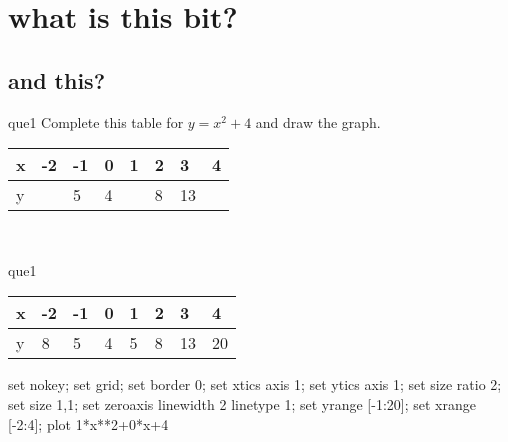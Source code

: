 \documentclass[13.5pt, varwidth=true]{beamer}
\begin{document}
\date{}

\section[Graphs]{what is this bit?}
\subsection[title]{and this?}

\begin{frame}[shrink=19,fragile]
	\begin{beamercolorbox}[rounded=true, left, shadow=true,wd=14.8cm]{que1}
		 Complete this table for $y = x^{2} + 4$ and draw the graph. \\[0.3cm] \renewcommand{\arraystretch}{1.2}\begin{tabular}{|C|C|C|C|C|C|C|C|} \hline x & -2 & -1 & 0 & 1 & 2 & 3 & 4 \\ \hline y &  & 5 & 4 &  & 8 & 13 & \\ \hline \end{tabular}\\[0.3cm]
	\end{beamercolorbox}
\end{frame}
\begin{frame}[shrink=19,fragile]
	\begin{beamercolorbox}[rounded=true, left, shadow=true,wd=14.8cm]{que1}
		\renewcommand{\arraystretch}{1.2}\begin{tabular}{|C|C|C|C|C|C|C|C|} \hline x & -2 & -1 & 0 & 1 & 2 & 3 & 4 \\ \hline y & 8 & 5 & 4 & 5 & 8 & 13 & 20\\ \hline \end{tabular}\begin{gnuplot}[terminal=pdf] set nokey; set grid; set border 0; set xtics axis 1; set ytics axis 1; set size ratio 2; set size 1,1; set zeroaxis linewidth 2 linetype 1; set yrange [-1:20]; set xrange [-2:4]; plot 1*x**2+0*x+4 \end{gnuplot}
	\end{beamercolorbox}
\end{frame}
\end{document}
